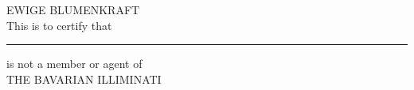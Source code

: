 \documentclass[11pt,a4paper]{memoir}
\begin{document}
\noindent
\begin{center}
	 EWIGE BLUMENKRAFT \\
	This is to certify that\\
\end{center}

\hskip 20pt
\par\noindent\rule{\textwidth}{0.4pt}

\begin{center}
is not a member or agent of\\
THE BAVARIAN ILLIMINATI\\
\end{center}
\end{document}
